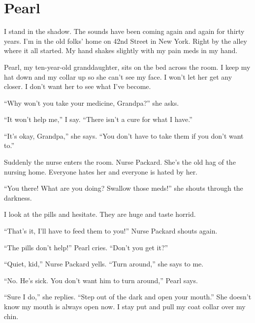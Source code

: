 \chapter{Pearl}



I stand in the shadow. The sounds have been coming again and again
for thirty years. I'm in the old folks' home on 42nd
Street in New York. Right by the alley where it all started. My
hand shakes slightly with my pain meds in my hand.



Pearl, my ten-year-old granddaughter, sits on the bed across the
room. I keep my hat down and my collar up so she can't see my
face. I won't let her get any closer. I don't want her
to see what I've become.



``Why won't you take your medicine, Grandpa?'' she
asks.



``It won't help me,'' I say. ``There
isn't a cure for what I have.''



``It's okay, Grandpa,'' she says. ``You
don't have to take them if you don't want
to.''



Suddenly the nurse enters the room. Nurse Packard. She's the
old hag of the nursing home. Everyone hates her and everyone is
hated by her.



``You there! What are you doing? Swallow those meds!''
she shouts through the darkness.



I look at the pills and hesitate. They are huge and taste
horrid.



``That's it, I'll have to feed them to you!''
Nurse Packard shouts again.



``The pills don't help!'' Pearl cries.
``Don't you get it?''



``Quiet, kid,'' Nurse Packard yells. ``Turn
around,'' she says to me.



``No. He's sick. You don't want him to turn
around,'' Pearl says.



``Sure I do,'' she replies. ``Step out of the dark
and open your mouth.'' She doesn't know my mouth is
always open now. I stay put and pull my coat collar over my
chin.



